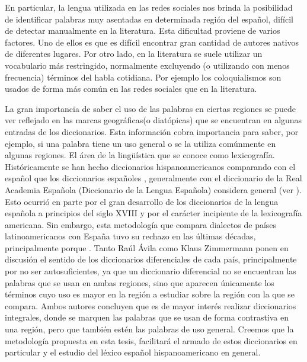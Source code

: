 En particular, la lengua utilizada en las redes sociales nos brinda la posibilidad de identificar palabras muy asentadas en determinada región del español, difícil de detectar manualmente en la literatura. Esta dificultad proviene de varios factores. Uno de ellos es que es difícil encontrar gran cantidad de autores nativos de diferentes lugares. Por otro lado, en la literatura se suele utilizar un vocabulario más restringido, normalmente excluyendo (o utilizando con menos frecuencia) términos del habla cotidiana. Por ejemplo los coloquialismos son usados de forma más común en las redes sociales que en la literatura. 

La gran importancia de saber el uso de las palabras en ciertas regiones se puede ver reflejado en las marcas geográficas(o diatópicas) que se encuentran en algunas entradas de los diccionarios. Esta información cobra importancia para saber, por ejemplo, si una palabra tiene un uso general o se la utiliza comúnmente en algunas regiones. El área de la lingüística que
 se conoce como lexicografía. Históricamente se han hecho diccionarios hispanoamericanos comparando con el español que los diccionarios españoles , generalmente con el diccionario de la Real Academia Española (Diccionario de la Lengua Española) considera general (ver \cite {zimmermann2006fin} ). Esto ocurrió en parte por el gran desarrollo de los diccionarios de la lengua española a principios del siglo XVIII y por el carácter incipiente de la lexicografía americana. Sin embargo, esta metodología que compara dialectos de países latinoamericanos con España tuvo su rechazo en las últimas décadas, principalmente porque . Tanto Raúl Ávila como Klaus Zimmermann ponen en discusión el sentido de los diccionarios diferenciales de cada país, principalmente por no ser autosuficientes, ya que un diccionario diferencial no se encuentran las palabras que se usan en ambas regiones, sino que aparecen únicamente los términos cuyo uso es mayor en la región a estudiar sobre la región con la que se compara. Ambos autores concluyen que es de mayor interés realizar diccionarios integrales, donde se marquen las palabras que se usan de forma contrastiva en una región, pero que también estén las palabras de uso general. Creemos que la metodología propuesta en esta tesis, facilitará el armado de estos diccionarios en particular y el estudio del léxico español hispanoamericano en general. 


